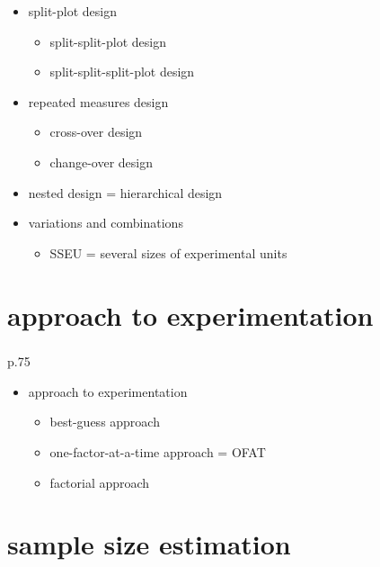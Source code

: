 \documentclass[
]{book}
\providecommand{\tightlist}{%
  \setlength{\itemsep}{0pt}\setlength{\parskip}{0pt}}
\theoremstyle{definition}
\theoremstyle{definition}
\theoremstyle{definition}
\theoremstyle{definition}
\theoremstyle{remark}
\begin{document}
\begin{itemize}
\tightlist
\item
  split-plot design

  \begin{itemize}
  \tightlist
  \item
    split-split-plot design
  \item
    split-split-split-plot design
  \end{itemize}
\item
  repeated measures design

  \begin{itemize}
  \tightlist
  \item
    cross-over design
  \item
    change-over design
  \end{itemize}
\item
  nested design = hierarchical design
\item
  variations and combinations

  \begin{itemize}
  \tightlist
  \item
    SSEU = several sizes of experimental units
  \end{itemize}
\end{itemize}

\section{approach to experimentation}\label{approach-to-experimentation}

\textsuperscript{} p.75

\begin{itemize}
\tightlist
\item
  approach to experimentation

  \begin{itemize}
  \tightlist
  \item
    best-guess approach
  \item
    one-factor-at-a-time approach = OFAT
  \item
    factorial approach
  \end{itemize}
\end{itemize}

\section{sample size estimation}\label{sample-size-estimation}
\end{document}
